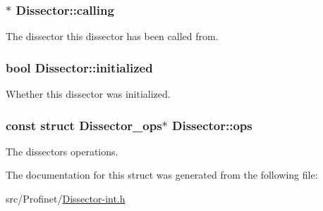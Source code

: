 \subsubsection[{calling}]{$\ast$ Dissector\+::calling}\label{struct_dissector_a9c793579ef8c1fa11c26a0d146bc2f2c}
The dissector this dissector has been called from. \hypertarget{struct_dissector_a86386b01b6edc229f64d438929d92a4f}{}
\subsubsection[{initialized}]{\setlength{\rightskip}{0pt plus 5cm}bool Dissector\+::initialized}\label{struct_dissector_a86386b01b6edc229f64d438929d92a4f}
Whether this dissector was initialized. \hypertarget{struct_dissector_a2786b3015a49f746ecbbc33840838a4e}{}
\subsubsection[{ops}]{\setlength{\rightskip}{0pt plus 5cm}const struct {\bf Dissector\+\_\+ops}$\ast$ Dissector\+::ops}\label{struct_dissector_a2786b3015a49f746ecbbc33840838a4e}
The dissectors operations. 

The documentation for this struct was generated from the following file\+:\begin{DoxyCompactItemize}
\item 
src/\+Profinet/\hyperlink{_dissector-int_8h}{Dissector-\/int.\+h}\end{DoxyCompactItemize}
